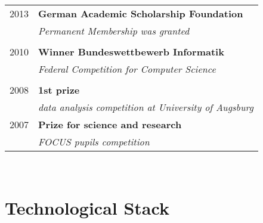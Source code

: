 \documentclass[a4paper,10pt]{article} %
\begin{document}
{\begin{minipage}[t]{0.44\textwidth}
\begin{tabular}{rl}
2013 & \textbf{German Academic Scholarship Foundation}\\
& \textit{Permanent Membership was granted}\\ \\


2010	 & \textbf{Winner Bundeswettbewerb Informatik}\\
& \textit{Federal Competition for Computer Science}\\ \\


2008	 & \textbf{1st prize}\\
& \textit{data analysis competition at University of Augsburg}\\[10pt]




2007	 & \textbf{Prize for science and research}\\
& \textit{FOCUS pupils competition}
\end{tabular}\\[10pt]


\section{Technological Stack}


\end{minipage}}
\end{document}
